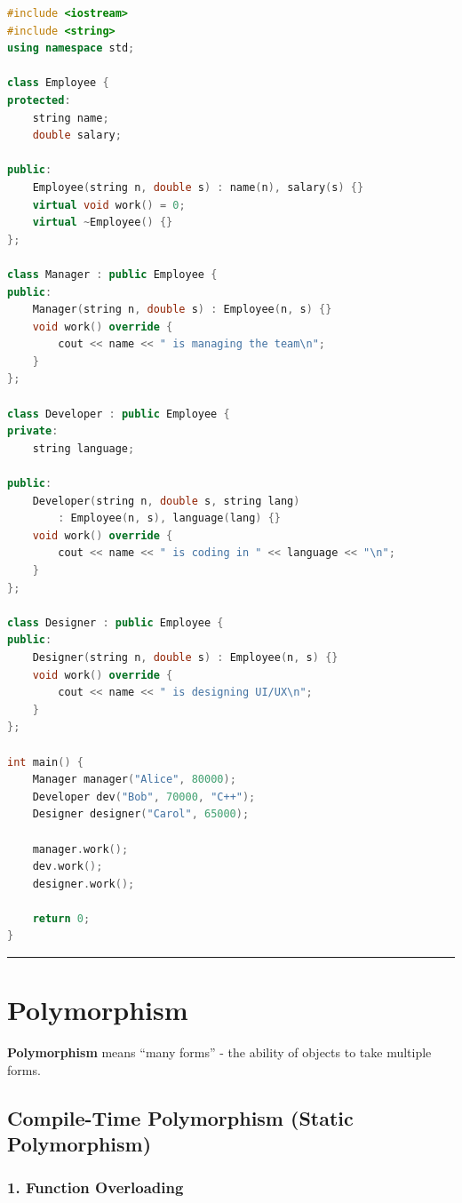 \begin{lstlisting}[language={C++}]
#include <iostream>
#include <string>
using namespace std;

class Employee {
protected:
    string name;
    double salary;
    
public:
    Employee(string n, double s) : name(n), salary(s) {}
    virtual void work() = 0;
    virtual ~Employee() {}
};

class Manager : public Employee {
public:
    Manager(string n, double s) : Employee(n, s) {}
    void work() override {
        cout << name << " is managing the team\n";
    }
};

class Developer : public Employee {
private:
    string language;
    
public:
    Developer(string n, double s, string lang)
        : Employee(n, s), language(lang) {}
    void work() override {
        cout << name << " is coding in " << language << "\n";
    }
};

class Designer : public Employee {
public:
    Designer(string n, double s) : Employee(n, s) {}
    void work() override {
        cout << name << " is designing UI/UX\n";
    }
};

int main() {
    Manager manager("Alice", 80000);
    Developer dev("Bob", 70000, "C++");
    Designer designer("Carol", 65000);
    
    manager.work();
    dev.work();
    designer.work();
    
    return 0;
}
\end{lstlisting}

\begin{center}\rule{0.5\linewidth}{0.5pt}\end{center}

\hypertarget{polymorphism}{%
\section{Polymorphism}\label{polymorphism}}

\textbf{Polymorphism} means ``many forms'' - the ability of objects to
take multiple forms.

\hypertarget{compile-time-polymorphism-static-polymorphism}{%
\subsection{Compile-Time Polymorphism (Static
Polymorphism)}\label{compile-time-polymorphism-static-polymorphism}}

\hypertarget{function-overloading}{%
\subsubsection{1. Function Overloading}\label{function-overloading}}

